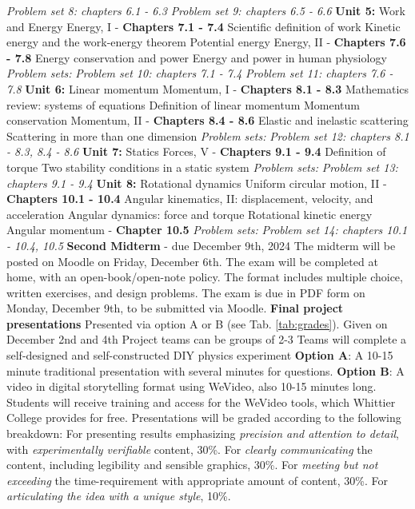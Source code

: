 \documentclass[10pt]{article}
\begin{document}
\begin{outline}[enumerate]
\3 \textit{Problem set 8: chapters 6.1 - 6.3}
\3 \textit{Problem set 9: chapters 6.5 - 6.6}
\1 \textbf{Unit 5:} Work and Energy
\2 Energy, I - \textbf{Chapters 7.1 - 7.4}
\3 Scientific definition of work
\3 Kinetic energy and the work-energy theorem
\3 Potential energy
\2 Energy, II - \textbf{Chapters 7.6 - 7.8}
\3 Energy conservation and power
\3 Energy and power in human physiology
\2 \textit{Problem sets:}
\3 \textit{Problem set 10: chapters 7.1 - 7.4}
\3 \textit{Problem set 11: chapters 7.6 - 7.8}
\1 \textbf{Unit 6:} Linear momentum
\2 Momentum, I - \textbf{Chapters 8.1 - 8.3}
\3 Mathematics review: systems of equations
\3 Definition of linear momentum
\3 Momentum conservation
\2 Momentum, II - \textbf{Chapters 8.4 - 8.6}
\3 Elastic and inelastic scattering
\3 Scattering in more than one dimension
\3 \textit{Problem sets:}
\3 \textit{Problem set 12: chapters 8.1 - 8.3, 8.4 - 8.6}
\1 \textbf{Unit 7:} Statics
\2 Forces, V - \textbf{Chapters 9.1 - 9.4}
\3 Definition of torque
\3 Two stability conditions in a static system
\2 \textit{Problem sets:}
\3 \textit{Problem set 13: chapters 9.1 - 9.4}
\clearpage
\1 \textbf{Unit 8:} Rotational dynamics
\2 Uniform circular motion, II - \textbf{Chapters 10.1 - 10.4}
\3 Angular kinematics, II: displacement, velocity, and acceleration 
\3 Angular dynamics: force and torque
\3 Rotational kinetic energy
\2 Angular momentum - \textbf{Chapter 10.5}
\2 \textit{Problem sets:}
\3 \textit{Problem set 14: chapters 10.1 - 10.4, 10.5}
\1 \textbf{Second Midterm} - due December 9th, 2024
\2 The midterm will be posted on Moodle on Friday, December 6th.
\2 The exam will be completed at home, with an open-book/open-note policy.  The format includes multiple choice, written exercises, and design problems.
\2 The exam is due in PDF form on Monday, December 9th, to be submitted via Moodle.
\1 \textbf{Final project presentations}
\2 Presented via option A or B (see Tab. \ref{tab:grades}).
\2 Given on December 2nd and 4th
\2 Project teams can be groups of 2-3
\2 Teams will complete a self-designed and self-constructed DIY physics experiment
\2 \textbf{Option A}: A 10-15 minute traditional presentation with several minutes for questions.
\2 \textbf{Option B}: A video in digital storytelling format using WeVideo, also 10-15 minutes long.
\2 Students will receive training and access for the WeVideo tools, which Whittier College provides for free.
\2 Presentations will be graded according to the following breakdown:
\3 For presenting results emphasizing \textit{precision and attention to detail}, with \textit{experimentally verifiable} content, 30\%.
\3 For \textit{clearly communicating} the content, including legibility and sensible graphics, 30\%.
\3 For \textit{meeting but not exceeding} the time-requirement with appropriate amount of content, 30\%.
\3 For \textit{articulating the idea with a unique style}, 10\%.
\end{outline}
\end{document}
